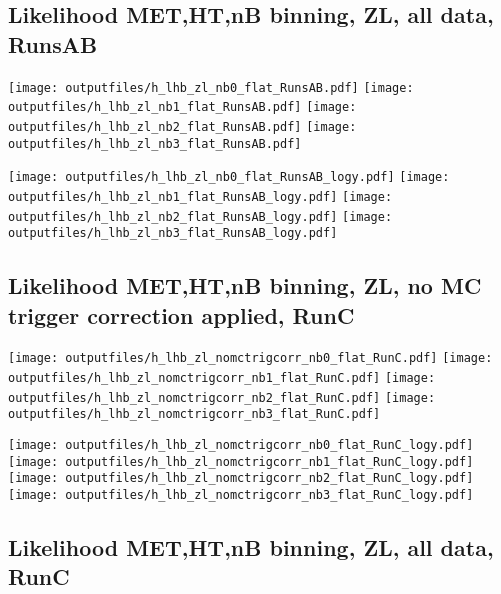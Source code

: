 \documentclass[11pt]{article}
\begin{document}
    \subsection{ Likelihood MET,HT,nB binning, ZL, all data, RunsAB }

    \noindent
     \texttt{[image: outputfiles/h\_lhb\_zl\_nb0\_flat\_RunsAB.pdf]}
     \texttt{[image: outputfiles/h\_lhb\_zl\_nb1\_flat\_RunsAB.pdf]}
     \texttt{[image: outputfiles/h\_lhb\_zl\_nb2\_flat\_RunsAB.pdf]}
     \texttt{[image: outputfiles/h\_lhb\_zl\_nb3\_flat\_RunsAB.pdf]}

    \noindent
     \texttt{[image: outputfiles/h\_lhb\_zl\_nb0\_flat\_RunsAB\_logy.pdf]}
     \texttt{[image: outputfiles/h\_lhb\_zl\_nb1\_flat\_RunsAB\_logy.pdf]}
     \texttt{[image: outputfiles/h\_lhb\_zl\_nb2\_flat\_RunsAB\_logy.pdf]}
     \texttt{[image: outputfiles/h\_lhb\_zl\_nb3\_flat\_RunsAB\_logy.pdf]}

   \clearpage

    \subsection{ Likelihood MET,HT,nB binning, ZL, no MC trigger correction applied, RunC }

    \noindent
     \texttt{[image: outputfiles/h\_lhb\_zl\_nomctrigcorr\_nb0\_flat\_RunC.pdf]}
     \texttt{[image: outputfiles/h\_lhb\_zl\_nomctrigcorr\_nb1\_flat\_RunC.pdf]}
     \texttt{[image: outputfiles/h\_lhb\_zl\_nomctrigcorr\_nb2\_flat\_RunC.pdf]}
     \texttt{[image: outputfiles/h\_lhb\_zl\_nomctrigcorr\_nb3\_flat\_RunC.pdf]}

    \noindent
     \texttt{[image: outputfiles/h\_lhb\_zl\_nomctrigcorr\_nb0\_flat\_RunC\_logy.pdf]}
     \texttt{[image: outputfiles/h\_lhb\_zl\_nomctrigcorr\_nb1\_flat\_RunC\_logy.pdf]}
     \texttt{[image: outputfiles/h\_lhb\_zl\_nomctrigcorr\_nb2\_flat\_RunC\_logy.pdf]}
     \texttt{[image: outputfiles/h\_lhb\_zl\_nomctrigcorr\_nb3\_flat\_RunC\_logy.pdf]}

   \clearpage

    \subsection{ Likelihood MET,HT,nB binning, ZL, all data, RunC }
\end{document}
